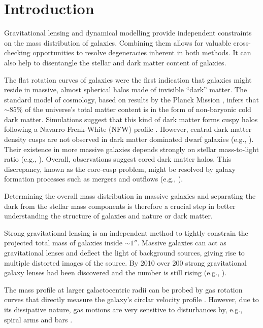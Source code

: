\section{Introduction}

Gravitational lensing and dynamical modelling provide independent constraints on the mass distribution of galaxies. Combining them allows for valuable cross-checking opportunities to resolve degeneracies inherent in both methods. It can also help to disentangle the stellar and dark matter content of galaxies.

The flat rotation curves of galaxies \citep{1978ApJ...225L.107R} were the first indication that galaxies might reside in massive, almost spherical halos made of invisible ``dark'' matter. The standard model of cosmology, based on results by the Planck Mission \citep{WMAP5cosm} , infers that $\sim 85\%$ of the universe's total matter content is in the form of non-baryonic cold dark matter. Simulations suggest that this kind of dark matter forms cuspy halos following a Navarro-Frenk-White (NFW) profile \citep{NFW96}. However, central dark matter density cusps are not observed in dark matter dominated dwarf galaxies (e.g., \citealt{1994Natur.370..629M,2001ApJ...552L..23D}). Their existence in more massive galaxies depends strongly on stellar mass-to-light ratio (e.g., \citealt{2011MNRAS.416..322D}). Overall, observations suggest cored dark matter halos. This discrepancy, known as the core-cusp problem, might be resolved by galaxy formation processes such as mergers and outflows (e.g., \citealt{2001ApJ...560..636E,2012MNRAS.421.3464P}).

Determining the overall mass distribution in massive galaxies and separating the dark from the stellar mass components is therefore a crucial step in better understanding the structure of galaxies and nature or dark matter.

Strong gravitational lensing is an independent method to tightly constrain the projected total mass of galaxies inside $\sim 1''$. Massive galaxies can act as gravitational lenses and deflect the light of background sources, giving rise to multiple distorted images of the source. By 2010 over 200 strong gravitational galaxy lenses had been discovered and the number is still rising (e.g., \citealt{2010ARA&A..48...87T}).

The mass profile at larger galactocentric radii can be probed by gas rotation curves that directly measure the galaxy's circlar velocity profile \Wilma{[TO DO: REF]}. However, due to its dissipative nature, gas motions are very sensitive to disturbances by, e.g., spiral arms and bars \Wilma{[TO DO: REF]}.

